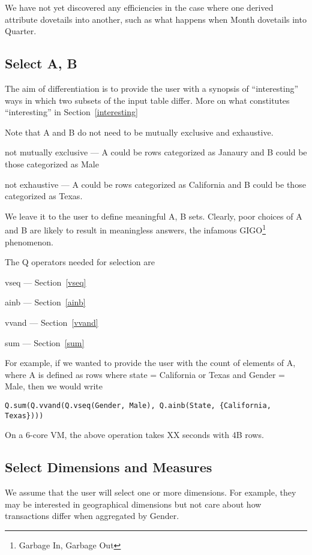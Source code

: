 \item 
We have not yet discovered any efficiencies in the case where one derived
attribute dovetails into another, such as what happens when Month 
dovetails into Quarter.
\ee

\subsection{Select A, B}
\label{SelectAB}

The aim of differentiation is to provide the user with a synopsis of
``interesting'' ways in which two subsets of the input table differ. 
More on what constitutes ``interesting'' in Section~\ref{interesting}

Note that A and B do not need to be mutually exclusive and exhaustive. 
\bi
\item not mutually exclusive --- 
A could be rows categorized as Janaury and B could be those
categorized as Male
\item not exhaustive  ---
A could be rows categorized as California and B could be those
categorized as Texas. 
\ei

We leave it to the user to define meaningful A, B sets.
Clearly, poor choices of A and B are likely to result in meaningless
answers, the infamous GIGO\footnote{Garbage In, Garbage Out} phenomenon.

The Q operators needed for selection are 
\be
\item vseq --- Section~\ref{vseq}
\item ainb --- Section~\ref{ainb}
\item vvand --- Section~\ref{vvand}
\item sum --- Section~\ref{sum}
\ee

For example, if we wanted to provide the user with the count of elements of A,
where A is defined as rows where state = California or Texas and Gender = Male,
then we would write
\begin{verbatim}
Q.sum(Q.vvand(Q.vseq(Gender, Male), Q.ainb(State, {California, Texas})))
\end{verbatim}
On a 6-core VM, the above operation takes XX seconds with 4B rows.

\subsection{Select Dimensions and Measures}
\label{DimsAndMeasures}

We assume that the user will select one or more dimensions. For example, they
may be interested in geographical dimensions but not care about how transactions
differ when aggregated by Gender. 

